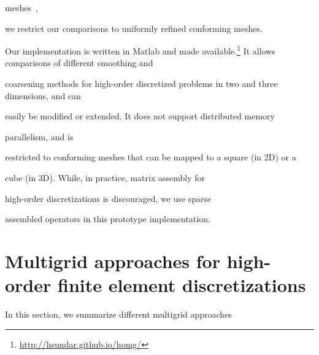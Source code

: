 \documentclass[smallcondensed,final]{svjour3}     %
\newcommand{\todo}[1]{\textcolor{red}{ #1}}
\begin{document}
meshes~\cite{SundarBirosBursteddeEtAl12, SampathBiros10}, 

we restrict our comparisons to uniformly refined conforming meshes.

Our implementation is written in Matlab and made available.\footnote{\url{http://hsundar.github.io/homg/}} It allows comparisons of different smoothing and

coarsening methods for high-order discretized problems in two and three dimensions, and can

easily be modified or extended. It does not support distributed memory

parallelism, and is

restricted to conforming meshes that can be mapped to a square (in 2D) or a

cube (in 3D). While, in practice, matrix assembly for

high-order discretizations is discouraged, we use sparse

assembled operators in this prototype implementation.

























\section{Multigrid approaches for high-order finite element discretizations}

\label{sec:approaches}



In this section, we summarize different multigrid approaches
\end{document}
